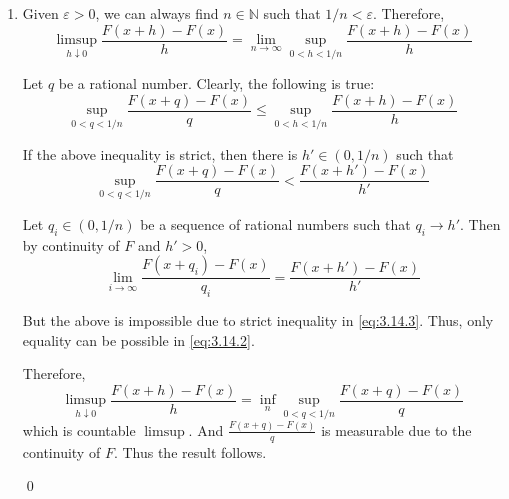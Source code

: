 \begin{problem}[3.14] \hfill
	\begin{enumerate}[label = (\alph*)]
		\item Given $\varepsilon >0$, we can always find $n \in \mathbb{N}$ such that $1/n < \varepsilon$.
			Therefore, 
			\[
				\limsup_{h\downarrow 0} \frac{F(x+h)-F(x)}{h} = \lim_{n\rightarrow \infty} \sup_{0<h<1/n} \frac{F(x+h)- F(x)}{h}
			\]

			Let $q$ be a rational number.
			Clearly, the following is true:
			\[
				\sup_{0<q<1/n}\frac{F(x+q)-F(x)}{q} \leq \sup_{0<h<1/n}\frac{F(x+h)-F(x)}{h}
				\label{eq:3.14.2}
				\tag{3.14.2}
			\]
			
			If the above inequality is strict, then there is $h' \in (0, 1/n)$ such that
			\[
				\sup_{0<q<1/n}\frac{F(x+q)-F(x)}{q} < \frac{F(x+h')-F(x)}{h'}
				\label{eq:3.14.3}
				\tag{3.14.3}
			\]
			
			Let $q_i \in (0, 1/n)$ be a sequence of rational numbers such that $q_i \rightarrow h'$.
			Then by continuity of $F$ and $h'>0$, 
			\[
				\lim_{i\rightarrow \infty} \frac{F(x+q_i) - F(x)}{q_i} = \frac{F(x+h') - F(x)}{h'}
			\]
			
			But the above is impossible due to strict inequality in \ref{eq:3.14.3}.
			Thus, only equality can be possible in \ref{eq:3.14.2}.

			Therefore, 
			\[
				\limsup_{h\downarrow 0}\frac{F(x+h) - F(x)}{h} = \inf_{n} \sup_{0<q<1/n} \frac{F(x+q) - F(x)}{q}
			\]
			which is countable $\limsup$. And $\frac{F(x+q)-F(x)}{q}$ is measurable due to the continuity of $F$.
			Thus the result follows.

			\qed
	\end{enumerate}
\end{problem}

